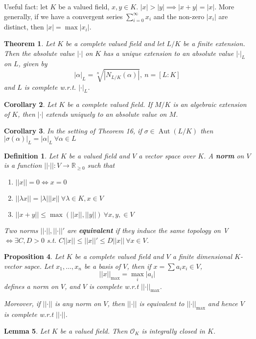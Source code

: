 \documentclass[a4paper]{article}
\newtheorem*{definition}{Definition}
\newtheorem{lemma}{Lemma}
\newtheorem{theorem}[lemma]{Theorem}
\newtheorem{prop}[lemma]{Proposition}
\newtheorem{corollary}[lemma]{Corollary}
\newcommand*\abs[1]{\left|#1\right|}
\newcommand*\norm[1]{\abs{\abs{#1}}}
\DeclareMathOperator{\Aut}{Aut}
\begin{document}
Useful fact: let $K$ be a valued field, $x, y \in K$. $\abs{x} > \abs{y} \implies \abs{x+y} = \abs{x}$. More generally, if we have a convergent series $\sum_{i=0}^\infty x_i$ and the non-zero $\abs{x_i}$ are distinct, then $\abs{x} = \max \abs{x_i}$.

\begin{theorem}
	Let $K$ be a complete valued field and let $L/K$ be a finite extension. Then the absolute value $\abs{\cdot}$ on $K$ has a unique extension to an absolute value $\abs{\cdot}_L$ on $L$, given by $$\abs{\alpha}_L = \sqrt[n]{\abs{N_{L/K}(\alpha)}},\ n=[L:K]$$ and $L$ is complete w.r.t. $\abs{\cdot}_L$. 
\end{theorem}

\begin{corollary}
	Let $K$ be a complete valued field. If $M/K$ is an algebraic extension of $K$, then $\abs{\cdot}$ extends uniquely to an absolute value on $M$.
\end{corollary}

\begin{corollary}
	In the setting of Theorem 16, if $\sigma \in \Aut(L/K)$ then $\abs{\sigma(\alpha)}_L = \abs{\alpha}_L\ \forall \alpha \in L$
\end{corollary}

\begin{definition}
	Let $K$ be a valued field and $V$ a vector space over $K$. A \textbf{norm} on $V$ is a function $\norm{\cdot}: V \to \mathbb{R}_{\geq 0}$ such that
	\begin{enumerate}[label=\roman*.]
		\item $\norm{x} = 0 \iff x = 0$
		\item $\norm{\lambda x} = \abs{\lambda}\norm{x}\ \forall \lambda \in K, x \in V$
		\item $\norm{x+y} \leq \max(\norm{x}, \norm{y})\ \forall x,y, \in V$
	\end{enumerate}
	Two norms $\norm{\cdot}, \norm{\cdot}'$ are \textbf{equivalent} if they induce the same topology on V $\iff \exists C,D > 0$ s.t. $C\norm{x} \leq \norm{x}' \leq D\norm{x}\ \forall x \in V$.
\end{definition}

\begin{prop}
	Let $K$ be a complete valued field and $V$ a finite dimensional $K$-vector sapce. Let $x_1, \dots, x_n$ be a basis of $V$, then if $x = \sum a_i x_i \in V$, $$\norm{x}_{\max} = \max_i \abs{a_i}$$ defines a norm on $V$, and $V$ is complete w.r.t $\norm{\cdot}_{\max}$.
	
	Moreover, if $\norm{\cdot}$ is any norm on $V$, then $\norm{\cdot}$ is equivalent to $\norm{\cdot}_{\max}$ and hence $V$ is complete w.r.t $\norm{\cdot}$.
\end{prop}
	
\begin{lemma}
	Let $K$ be a valued field. Then $\mathcal{O}_K$ is integrally closed in $K$.
\end{lemma}
\end{document}
